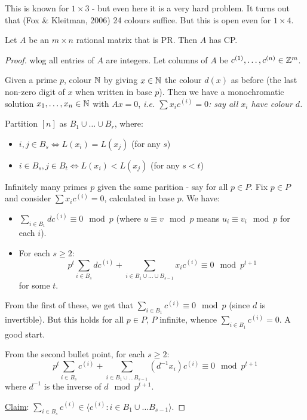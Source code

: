 \documentclass[10pt]{article}
\begin{document}
This is known for $1\times 3$ - but even here it is a very hard problem. It turns out that (Fox \& Kleitman, 2006) 24 colours suffice. But this is open even for $1\times 4$.

\begin{prop}
    Let $A$ be an $m\times n$ rational matrix that is PR. Then $A$ has CP.
\end{prop}
\begin{proof}
    wlog all entries of $A$ are integers. Let columns of $A$ be $c^{(1)},\dots,c^{(n)}\in \mathbb{Z}^m$.

    Given a prime $p$, colour $\mathbb{N}$ by giving $x \in \mathbb{N}$ the colour $d(x)$ as before (the last non-zero digit of $x$ when written in base $p$). Then we have a monochromatic solution $x_1,\dots,x_n \in \mathbb{N}$ with $Ax = 0$, \it{i.e.} $\sum x_ic^{(i)} = 0$: say all $x_i$ have colour $d$.

    Partition $[n]$ as $B_1\cup\dots\cup B_r$, where:
    \begin{itemize}
        \item $i,j \in B_s \iff L(x_i) = L(x_j)$ (for any $s$)
        \item $i \in B_s, j \in B_t \iff L(x_i) < L(x_j)$ (for any $s < t$)
    \end{itemize}

    Infinitely many primes $p$ given the same parition - say for all $p \in P$. Fix $p \in P$ and consider $\sum x_ic^{(i)} = 0$, calculated in base $p$. We have:
    \begin{itemize}
        \item $\sum_{i \in B_1}dc^{(i)} \equiv 0\mod p$ (where $u\equiv v \mod p$ means $u_i \equiv v_i \mod p$ for each $i$).
        \item For each $s \ge 2$: $$p^t\sum_{i \in B_s}dc^{(i)} + \sum_{i \in B_1\cup\dots\cup B_{s-1}}x_ic^{(i)}\equiv 0\mod p^{t+1}$$ for some $t$.
    \end{itemize}

    From the first of these, we get that $\sum_{i\in B_1}c^{(i)} \equiv 0 \mod p$ (since $d$ is invertible). But this holds for all $p \in P$, $P$ infinite, whence $\sum_{i \in B_1}c^{(i)} = 0$. A good start.

    From the second bullet point, for each $s \ge 2$: $$p^t\sum_{i \in B_s}c^{(i)} + \sum_{i \in B_1\cup\dots B_{s-1}}(d^{-1}x_i)c^{(i)} \equiv 0 \mod p^{t+1}$$ where $d^{-1}$ is the inverse of $d \mod p^{t+1}$.

    \underline{Claim}: $\sum_{i \in B_s}c^{(i)}\in \langle c^{(i)}:i\in B_1\cup\dots B_{s-1}\rangle$.


\end{proof}
\end{document}
